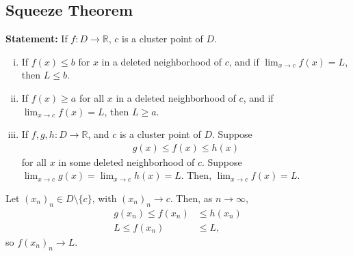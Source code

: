 \documentclass[10pt]{extarticle}
\newcommand{\R}{\mathbb{R}}
\begin{document}
  \subsection{Squeeze Theorem}%
    \textbf{Statement:} If $f:D\rightarrow \R$, $c$ is a cluster point of $D$.
    \begin{enumerate}[(i)]
      \item If $f(x) \leq b$ for $x$ in a deleted neighborhood of $c$, and if $\lim_{x\rightarrow c}f(x) = L$, then $L \leq b$.
      \item If $f(x) \geq a$ for all $x$ in a deleted neighborhood of $c$, and if $\lim_{x\rightarrow c}f(x) = L$, then $L \geq a$.
      \item If $f,g,h: D\rightarrow \R$, and $c$ is a cluster point of $D$. Suppose
        \begin{align*}
          g(x) \leq f(x) \leq h(x)
        \end{align*}
        for all $x$ in some deleted neighborhood of $c$. Suppose $\lim_{x\rightarrow c}g(x) = \lim_{x\rightarrow c}h(x) = L$. Then, $\lim_{x\rightarrow c}f(x) = L$.
    \end{enumerate}
    
    \begin{description}[font=\normalfont]
      \item[Proof of (iii)] Let $(x_n)_n\in D\setminus \{c\}$, with $(x_n)_n \rightarrow c$. Then, as $n\rightarrow \infty$,
        \begin{align*}
          g(x_n) \leq f(x_n) &\leq h(x_n)\\
          L \leq f(x_n) &\leq L,
        \end{align*}
        so $f(x_n)_n \rightarrow L$.
    \end{description}
\end{document}
